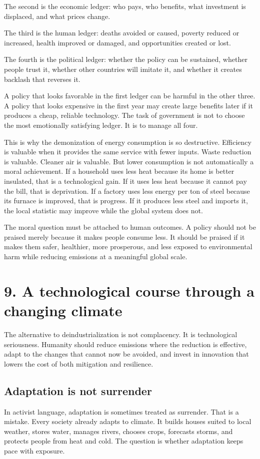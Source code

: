﻿\documentclass[12pt,a4paper]{book}
\begin{document}
The second is the economic ledger: who pays, who benefits, what investment is displaced, and what prices change.

The third is the human ledger: deaths avoided or caused, poverty reduced or increased, health improved or damaged, and opportunities created or lost.

The fourth is the political ledger: whether the policy can be sustained, whether people trust it, whether other countries will imitate it, and whether it creates backlash that reverses it.

A policy that looks favorable in the first ledger can be harmful in the other three. A policy that looks expensive in the first year may create large benefits later if it produces a cheap, reliable technology. The task of government is not to choose the most emotionally satisfying ledger. It is to manage all four.

This is why the demonization of energy consumption is so destructive. Efficiency is valuable when it provides the same service with fewer inputs. Waste reduction is valuable. Cleaner air is valuable. But lower consumption is not automatically a moral achievement. If a household uses less heat because its home is better insulated, that is a technological gain. If it uses less heat because it cannot pay the bill, that is deprivation. If a factory uses less energy per ton of steel because its furnace is improved, that is progress. If it produces less steel and imports it, the local statistic may improve while the global system does not.

The moral question must be attached to human outcomes. A policy should not be praised merely because it makes people consume less. It should be praised if it makes them safer, healthier, more prosperous, and less exposed to environmental harm while reducing emissions at a meaningful global scale.

\section{9. A technological course through a changing climate}
The alternative to deindustrialization is not complacency. It is technological seriousness. Humanity should reduce emissions where the reduction is effective, adapt to the changes that cannot now be avoided, and invest in innovation that lowers the cost of both mitigation and resilience.

\subsection{Adaptation is not surrender}
In activist language, adaptation is sometimes treated as surrender. That is a mistake. Every society already adapts to climate. It builds houses suited to local weather, stores water, manages rivers, chooses crops, forecasts storms, and protects people from heat and cold. The question is whether adaptation keeps pace with exposure.
\end{document}
